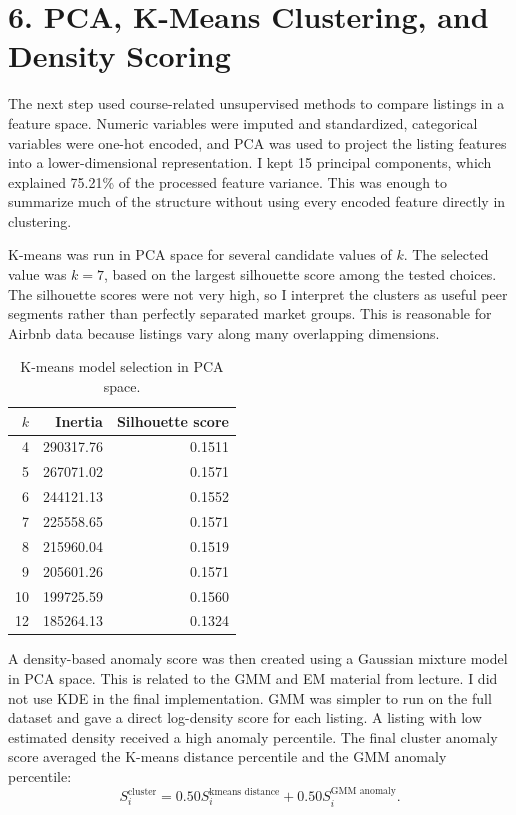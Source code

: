 \documentclass[11pt]{article}
\begin{document}
\section*{6. PCA, K-Means Clustering, and Density Scoring}

The next step used course-related unsupervised methods to compare listings in a feature space. Numeric variables were imputed and standardized, categorical variables were one-hot encoded, and PCA was used to project the listing features into a lower-dimensional representation. I kept 15 principal components, which explained 75.21\% of the processed feature variance. This was enough to summarize much of the structure without using every encoded feature directly in clustering.

K-means was run in PCA space for several candidate values of $k$. The selected value was $k=7$, based on the largest silhouette score among the tested choices. The silhouette scores were not very high, so I interpret the clusters as useful peer segments rather than perfectly separated market groups. This is reasonable for Airbnb data because listings vary along many overlapping dimensions.

\begin{table}[H]
\centering
\caption{K-means model selection in PCA space.}
\begin{tabular}{rrr}
\toprule
$k$ & Inertia & Silhouette score \\
\midrule
4 & 290317.76 & 0.1511 \\
5 & 267071.02 & 0.1571 \\
6 & 244121.13 & 0.1552 \\
7 & 225558.65 & 0.1571 \\
8 & 215960.04 & 0.1519 \\
9 & 205601.26 & 0.1571 \\
10 & 199725.59 & 0.1560 \\
12 & 185264.13 & 0.1324 \\
\bottomrule
\end{tabular}
\end{table}

A density-based anomaly score was then created using a Gaussian mixture model in PCA space. This is related to the GMM and EM material from lecture. I did not use KDE in the final implementation. GMM was simpler to run on the full dataset and gave a direct log-density score for each listing. A listing with low estimated density received a high anomaly percentile. The final cluster anomaly score averaged the K-means distance percentile and the GMM anomaly percentile:
\[
S^{\text{cluster}}_i
=0.50S^{\text{kmeans distance}}_i
+0.50S^{\text{GMM anomaly}}_i.
\]
\end{document}
